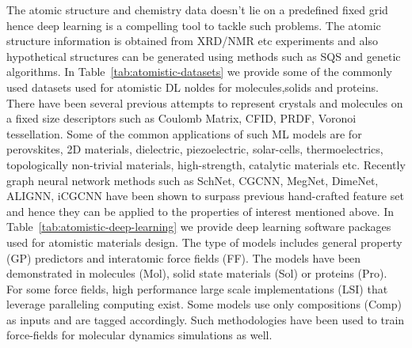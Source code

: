 \documentclass[pdflatex,sn-mathphys]{sn-jnl}%
\theoremstyle{thmstyleone}%
\theoremstyle{thmstyletwo}%
\theoremstyle{thmstylethree}%
\begin{document}
The atomic structure and chemistry data doesn't lie on a predefined fixed grid hence deep learning is a compelling tool to tackle such problems. The atomic structure information is obtained from XRD/NMR etc experiments and also hypothetical structures can be generated using methods such as SQS and genetic algorithms. In Table~\ref{tab:atomistic-datasets} we provide some of the commonly used datasets used for atomistic DL noldes for molecules,solids and proteins.
There have been several previous attempts to represent crystals and molecules on a fixed size descriptors such as Coulomb Matrix, CFID, PRDF, Voronoi tessellation. Some of the common applications of such ML models are for perovskites, 2D materials, dielectric, piezoelectric, solar-cells, thermoelectrics, topologically non-trivial materials, high-strength, catalytic materials etc. Recently graph neural network methods such as SchNet, CGCNN, MegNet, DimeNet, ALIGNN, iCGCNN have been shown to surpass previous hand-crafted feature set and hence they can be applied to the properties of interest mentioned above. In Table~\ref{tab:atomistic-deep-learning} we provide deep learning software packages used for atomistic materials design. The type of models includes general property (GP) predictors and interatomic force fields (FF). The models have been demonstrated in molecules (Mol), solid state materials (Sol) or proteins (Pro). For some force fields, high performance large scale implementations (LSI) that leverage paralleling computing exist. Some models use only compositions (Comp) as inputs and are tagged accordingly. Such methodologies have been used to train force-fields for molecular dynamics simulations as well.
\end{document}
